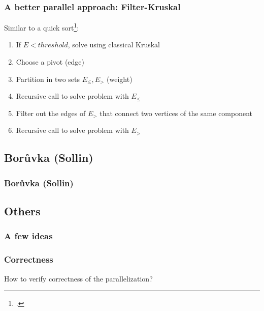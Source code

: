 \documentclass{beamer}
\begin{document}
\begin{frame}
    \frametitle{A better parallel approach: Filter-Kruskal}
    Similar to a quick sort\footcite{Osipov:2009:FMS:2791220.2791225}:
    \begin{enumerate}
        \item If $E < threshold$, solve using classical Kruskal
        \item Choose a pivot (edge)
        \item Partition in two sets $E_{\leq}, E_>$ (weight)
        \item Recursive call to solve problem with $E_{\leq}$
        \item Filter out the edges of $E_>$ that connect two vertices of the same component
        \item Recursive call to solve problem with $E_>$
    \end{enumerate}


\end{frame}

\subsection{Borůvka (Sollin)}
\begin{frame}
\frametitle{Borůvka (Sollin)}
\end{frame}
\subsection{Others}
\begin{frame}
\frametitle{A few ideas}
\end{frame}
\begin{frame}
\frametitle{Correctness}
How to verify correctness of the parallelization?
\end{frame}

\end{document}
